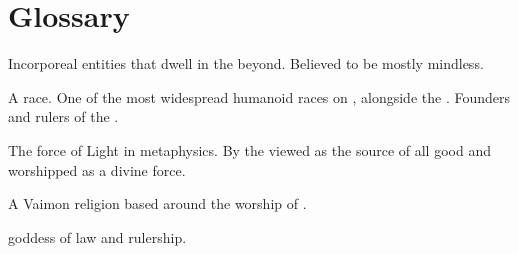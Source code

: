 \documentclass
  [a4paper,
   12pt,
   oneside
  ]%
  {article}
\begin{document}
\section{Glossary}
\begin{gloss}



\begin{comment}
\paragraph{\daemon}
\end{comment}
\gitem[\daemons]{\daemon}
Incorporeal entities that dwell in the beyond. 
Believed to be mostly mindless. 




\begin{comment}
\paragraph{\human}
\end{comment}
\gitem{\human}
A  race. 
One of the most widespread humanoid races on \Miith{}, alongside the \scathae. 
Founders and rulers of the \VaimonCaliphate. 



\begin{comment}
\subsection{\iquin}
\end{comment}
\gitem{\iquin}
The force of Light in  metaphysics. 
By the  viewed as the source of all good and worshipped as a divine force. 



\begin{comment}
\paragraph{\Iquinian Church}
\end{comment}
A Vaimon religion based around the worship of . 



\begin{comment}
\paragraph{Isxae}
\end{comment}
\gitem{\Isxae}
\Ortaican goddess of law and rulership.




\end{gloss}
\end{document}
